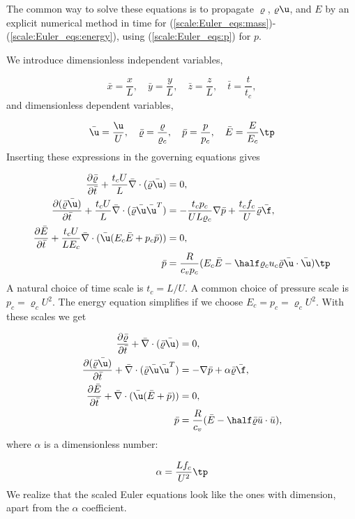 \documentclass[graybox,envcountchap,sectrefs,final]{svmonodo}
\begin{document}
The common way to solve these equations is to propagate $\varrho$,
$\varrho\u$, and $E$ by an explicit numerical method in time for
(\ref{scale:Euler_eqs:mass})-(\ref{scale:Euler_eqs:energy}),
using (\ref{scale:Euler_eqs:p}) for $p$.


We introduce dimensionless independent variables,

\[ \bar x = \frac{x}{L},\quad \bar y = \frac{y}{L},\quad \bar z = \frac{z}{L},
\quad \bar t = \frac{t}{t_c},\]
and dimensionless dependent variables,

\[ \bar\u = \frac{\u}{U},\quad\bar\varrho = \frac{\varrho}{\varrho_c},
\quad\bar p = \frac{p}{p_c},\quad \bar E= \frac{E}{E_c}\tp\]
Inserting these expressions in the governing equations gives

\begin{align*}
\frac{\partial\bar\varrho}{\partial\bar t} + \frac{t_c U}{L}\bar\nabla\cdot(\bar\varrho\bar\u) &= 0,\\ 
\frac{\partial(\bar\varrho\bar\u)}{\partial\bar t} + \frac{t_cU}{L}\bar\nabla\cdot(\bar\varrho\bar\u\bar\u^T) &= -\frac{t_cp_c}{UL\varrho_c}\nabla\bar p + \frac{t_c f_c}{U}\bar\varrho \bar\f,\\ 
\frac{\partial\bar E}{\partial\bar t} + \frac{t_c U}{LE_c }\bar\nabla\cdot(\bar\u(E_c\bar E+p_c\bar p)) &= 0,\\ 
\bar p & = \frac{R}{c_v p_c}(E_c\bar E - \half\varrho_cu_c\bar\varrho\bar\u\cdot\bar\u)\tp
\end{align*}
A natural choice of time scale is $t_c=L/U$. A common choice of
pressure scale is $p_c=\varrho_c U^2$. The energy equation simplifies if
we choose $E_c=p_c=\varrho_c U^2$. With these scales we get

\begin{align*}
\frac{\partial\bar\varrho}{\partial\bar t} +
\bar\nabla\cdot(\bar\varrho\bar\u) &= 0,\\ 
\frac{\partial(\bar\varrho\bar\u)}{\partial\bar t} +
\bar\nabla\cdot(\bar\varrho\bar\u\bar\u^T) &=
-\nabla\bar p + \alpha\bar\varrho \bar\f,\\ 
\frac{\partial\bar E}{\partial\bar t} +
\bar\nabla\cdot(\bar\u(\bar E+ \bar p)) &= 0,\\ 
\bar p & = \frac{R}{c_v}(\bar E - \half\bar\varrho\bar u\cdot\bar u),
\end{align*}
where $\alpha$ is a dimensionless number:

\[ \alpha = \frac{Lf_c}{U^2}\tp\]
We realize that the scaled Euler equations look like
the ones with dimension, apart from the $\alpha$ coefficient.
\end{document}
